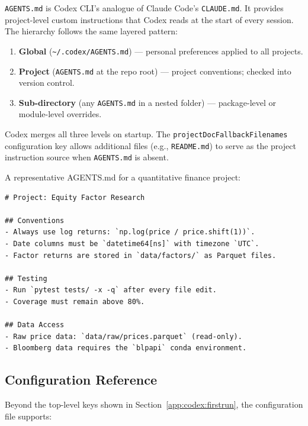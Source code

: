 \texttt{AGENTS.md} is Codex CLI's analogue of Claude Code's
\texttt{CLAUDE.md}.  It provides project-level custom instructions that Codex
reads at the start of every session.  The hierarchy follows the same layered
pattern:

\begin{enumerate}
  \item \textbf{Global} (\texttt{\textasciitilde/.codex/AGENTS.md}) ---
        personal preferences applied to all projects.
  \item \textbf{Project} (\texttt{AGENTS.md} at the repo root) --- project
        conventions; checked into version control.
  \item \textbf{Sub-directory} (any \texttt{AGENTS.md} in a nested folder) ---
        package-level or module-level overrides.
\end{enumerate}

Codex merges all three levels on startup.  The
\texttt{projectDocFallbackFilenames} configuration key allows additional files
(e.g., \texttt{README.md}) to serve as the project instruction source when
\texttt{AGENTS.md} is absent.

A representative AGENTS.md for a quantitative finance project:

\begin{verbatim}
# Project: Equity Factor Research

## Conventions
- Always use log returns: `np.log(price / price.shift(1))`.
- Date columns must be `datetime64[ns]` with timezone `UTC`.
- Factor returns are stored in `data/factors/` as Parquet files.

## Testing
- Run `pytest tests/ -x -q` after every file edit.
- Coverage must remain above 80%.

## Data Access
- Raw price data: `data/raw/prices.parquet` (read-only).
- Bloomberg data requires the `blpapi` conda environment.
\end{verbatim}

\subsection{Configuration Reference}
\label{app:codex:config-ref}

Beyond the top-level keys shown in Section~\ref{app:codex:firstrun}, the
configuration file supports:


